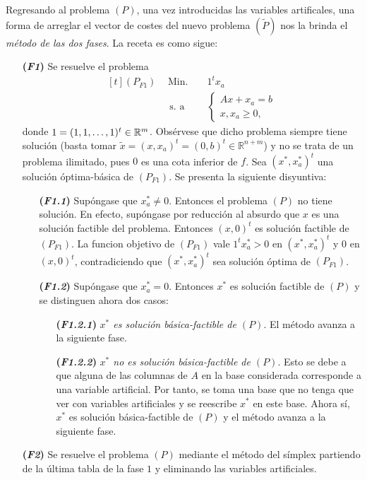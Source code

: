 \documentclass[11pt]{report}
\theoremstyle{mytheorem}
\theoremstyle{mydefinition}
\theoremstyle{myexample}
\newcommand{\R}{\mathbb R}
\begin{document}
Regresando al problema $(P)$, una vez introducidas las variables artificales, una forma de arreglar el vector de costes del nuevo problema $(\tilde{P})$ nos la brinda el {\textit{método de las dos fases}}. La receta es como sigue:
\begin{itemize}
    \item[\textbf{(\textit{F1})}] Se resuelve el problema
    \[\begin{aligned}[t]
    (P_{F1}) \ \,&\text{Min. } && 1^tx_a \\
    & \, \text{s. a} &&\begin{cases}
    Ax+x_a = b \\
    x,x_a \geq 0,
\end{cases}
\end{aligned}\]
donde $1 = (1,1,\mathellipsis,1)^t \in \R^m$. Obsérvese que dicho problema siempre tiene solución (basta tomar $\tilde{x} = (x,x_a)^t = (0,b)^t \in \R^{n+m}$) y no se trata de un problema ilimitado, pues $0$ es una cota inferior de $f$. Sea $(x^*,x_a^*)^t$ una solución óptima-básica de $(P_{F1})$. Se presenta la siguiente disyuntiva:
\begin{itemize}
    \item[\textbf{(\textit{F1.1})}] Supóngase que $x_a^* \neq 0$. Entonces el problema $(P)$ no tiene solución. En efecto, supóngase por reducción al absurdo que $x$ es una solución factible del problema. Entonces $(x,0)^t$ es solución factible de $(P_{F1})$. La funcion objetivo de $(P_{F1})$ vale $1^tx_a^* > 0$ en $(x^*,x_a^*)^t$ y $0$ en $(x,0)^t$, contradiciendo que $(x^*,x_a^*)^t$ sea solución óptima de $(P_{F1})$.
    \item[\textbf{(\textit{F1.2})}] Supóngase que $x_a^* = 0$. Entonces $x^*$ es solución factible de $(P)$ y se distinguen ahora dos casos:
    \begin{itemize}
        \item[\textbf{(\textit{F1.2.1})}] \textit{$x^*$ es solución básica-factible de $(P)$}. El método avanza a la siguiente fase.
        \item[\textbf{(\textit{F1.2.2})}] \textit{$x^*$ no es solución básica-factible de $(P)$}. Esto se debe a que alguna de las columnas de $A$ en la base considerada corresponde a una variable artificial. Por tanto, se toma una base que no tenga que ver con variables artificiales y se reescribe $x^*$ en este base. Ahora sí, $x^*$ es solución básica-factible de $(P)$ y el método avanza a la siguiente fase.
    \end{itemize}
\end{itemize}
    \item[\textbf{(\textit{F2})}] Se resuelve el problema $(P)$ mediante el método del símplex partiendo de la última tabla de la fase $1$ y eliminando las variables artificiales.
\end{itemize}
\end{document}
